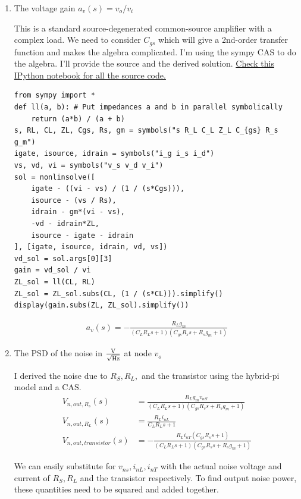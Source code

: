 \begin{enumerate}[label=(\alph*)]
  \item {\color{blue}The voltage gain $a_v(s) = v_o / v_i$}

    This is a standard source-degenerated common-source amplifier with a complex load. We need to consider $C_{gs}$ which will give a 2nd-order transfer function and makes the algebra complicated. I'm using the sympy CAS to do the algebra. I'll provide the source and the derived solution. \href{https://github.com/vighneshiyer/ee240b/blob/master/hw/hw2/hw2_notebook.ipynb}{Check this IPython notebook for all the source code.}

    \begin{verbatim}
from sympy import *
def ll(a, b): # Put impedances a and b in parallel symbolically
    return (a*b) / (a + b)
s, RL, CL, ZL, Cgs, Rs, gm = symbols("s R_L C_L Z_L C_{gs} R_s g_m")
igate, isource, idrain = symbols("i_g i_s i_d")
vs, vd, vi = symbols("v_s v_d v_i")
sol = nonlinsolve([
    igate - ((vi - vs) / (1 / (s*Cgs))),
    isource - (vs / Rs),
    idrain - gm*(vi - vs),
    -vd - idrain*ZL,
    isource - igate - idrain
], [igate, isource, idrain, vd, vs])
vd_sol = sol.args[0][3]
gain = vd_sol / vi
ZL_sol = ll(CL, RL)
ZL_sol = ZL_sol.subs(CL, (1 / (s*CL))).simplify()
display(gain.subs(ZL, ZL_sol).simplify())
    \end{verbatim}
    \begin{align*}
      a_v(s) = - \frac{R_{L} g_{m}}{\left(C_{L} R_{L} s + 1\right) \left(C_{gs} R_{s} s + R_{s} g_{m} + 1\right)}
    \end{align*}

  \item {\color{blue}The PSD of the noise in $\frac{\text{V}}{\sqrt{\text{Hz}}}$ at node $v_o$}

    I derived the noise due to $R_S, R_L, $ and the transistor using the hybrid-pi model and a CAS.
    \begin{align*}
      V_{n, out, R_s}(s) &= \frac{R_{L} g_{m} v_{nS}}{\left(C_{L} R_{L} s + 1\right) \left(C_{gs} R_{s} s + R_{s} g_{m} + 1\right)} \\
      V_{n, out, R_L}(s) &= \frac{R_{L} i_{nL}}{C_{L} R_{L} s + 1} \\
      V_{n, out, transistor}(s) &= - \frac{R_{L} i_{nT} \left(C_{gs} R_{s} s + 1\right)}{\left(C_{L} R_{L} s + 1\right) \left(C_{gs} R_{s} s + R_{s} g_{m} + 1\right)}
    \end{align*}

    We can easily substitute for $v_{ns}, i_{nL}, i_{nT}$ with the actual noise voltage and current of $R_S, R_L$ and the transistor respectively. To find output noise power, these quantities need to be squared and added together.


\end{enumerate}
